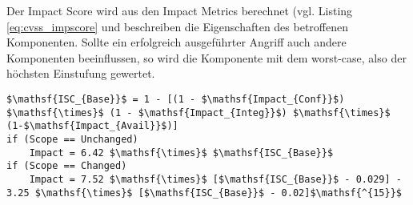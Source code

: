     \noindent Der Impact Score wird aus den Impact Metrics berechnet (vgl. Listing \ref{eq:cvss_impscore} und beschreiben die Eigenschaften des betroffenen Komponenten. 
    Sollte ein erfolgreich ausgeführter Angriff auch andere Komponenten beeinflussen, so wird die Komponente mit dem worst-case, also der höchsten Einstufung gewertet.
    \smallskip\\
    \begin{lstlisting}[caption={Berechnung des Impact Score \cite{CVSSspec}},label=eq:cvss_impscore,captionpos=b,mathescape=true]
$\mathsf{ISC_{Base}}$ = 1 - [(1 - $\mathsf{Impact_{Conf}}$) $\mathsf{\times}$ (1 - $\mathsf{Impact_{Integ}}$) $\mathsf{\times}$ (1-$\mathsf{Impact_{Avail}}$)]
if (Scope == Unchanged)
    Impact = 6.42 $\mathsf{\times}$ $\mathsf{ISC_{Base}}$
if (Scope == Changed)
    Impact = 7.52 $\mathsf{\times}$ [$\mathsf{ISC_{Base}}$ - 0.029] - 3.25 $\mathsf{\times}$ [$\mathsf{ISC_{Base}}$ - 0.02]$\mathsf{^{15}}$
    \end{lstlisting}
